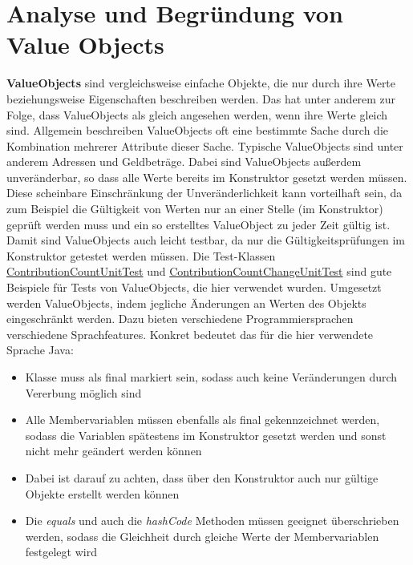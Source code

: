 \documentclass[12pt]{article}
\begin{document}
\newpage

\section{Analyse und Begründung von Value Objects}

\textbf{ValueObjects} sind vergleichsweise einfache Objekte, die nur durch ihre Werte beziehungsweise Eigenschaften beschreiben werden.
Das hat unter anderem zur Folge, dass ValueObjects als gleich angesehen werden, wenn ihre Werte gleich sind.
Allgemein beschreiben ValueObjects oft eine bestimmte Sache durch die Kombination mehrerer Attribute dieser Sache. Typische ValueObjects sind unter anderem Adressen und Geldbeträge.
Dabei sind ValueObjects außerdem unveränderbar, so dass alle Werte bereits im Konstruktor gesetzt werden müssen.
Diese scheinbare Einschränkung der Unveränderlichkeit kann vorteilhaft sein, da zum Beispiel die Gültigkeit von Werten nur an einer Stelle (im Konstruktor) geprüft werden muss und ein so erstelltes ValueObject zu jeder Zeit gültig ist. Damit sind ValueObjects auch leicht testbar, da nur die Gültigkeitsprüfungen im Konstruktor getestet werden müssen. 
Die Test-Klassen \href{https://github.com/lukaspanni/OpenSourceStats/blob/main/app/src/test/java/de/lukaspanni/opensourcestats/ContributionCountUnitTest.java}{ContributionCountUnitTest} und \href{https://github.com/lukaspanni/OpenSourceStats/blob/main/app/src/test/java/de/lukaspanni/opensourcestats/ContributionCountChangeUnitTest.java}{ContributionCountChangeUnitTest} sind gute Beispiele für Tests von ValueObjects, die hier verwendet wurden.
\newline
Umgesetzt werden ValueObjects, indem jegliche Änderungen an Werten des Objekts eingeschränkt werden. Dazu bieten verschiedene Programmiersprachen verschiedene Sprachfeatures.
\newline
Konkret bedeutet das für die hier verwendete Sprache Java:
\begin{itemize}
\item{Klasse muss als final markiert sein, sodass auch keine Veränderungen durch Vererbung möglich sind}
\item{Alle Membervariablen müssen ebenfalls als final gekennzeichnet werden, sodass die Variablen spätestens im Konstruktor gesetzt werden und sonst nicht mehr geändert werden können}
\item{Dabei ist darauf zu achten, dass über den Konstruktor auch nur gültige Objekte erstellt werden können}
\item{Die \textit{equals} und auch die \textit{hashCode} Methoden müssen geeignet überschrieben werden, sodass die Gleichheit durch gleiche Werte der Membervariablen festgelegt wird}
\end{itemize}
\end{document}
